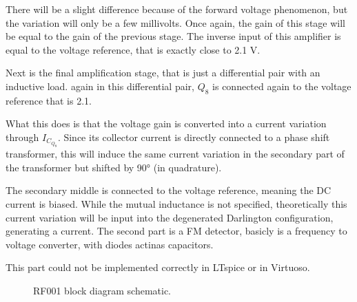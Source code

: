 \documentclass[12pt]{article}
\begin{document}
There will be a slight difference because of the forward voltage phenomenon, but the variation will only be a few millivolts. Once again, the gain of this stage will be equal to the gain of the previous stage. The inverse input of this amplifier is equal to the voltage reference, that is exactly close to 2.1 V.

Next is the final amplification stage, that is just a differential pair with an inductive load. again in this differential pair, $Q_8$ is connected again to the voltage reference that is 2.1.

What this does is that the voltage gain is converted into a current variation through $I_{C_{Q_8}}$. Since its collector current is directly connected to a phase shift transformer, this will induce the same current variation in the secondary part of the transformer but shifted by 90° (in quadrature). 

The secondary middle is connected to the voltage reference, meaning the DC current is biased. While the mutual inductance is not specified, theoretically this current variation will be input into the degenerated Darlington configuration, generating a current. 
The second part is a FM detector, basicly is a frequency to voltage converter, with diodes actinas capacitors.

This part could not be implemented correctly in LTspice or in Virtuoso.



\begin{figure}[H]
        \centering
        
        \caption{RF001 block diagram schematic.}
        \label{RF001block }
\end{figure}

\newpage
\end{document}
